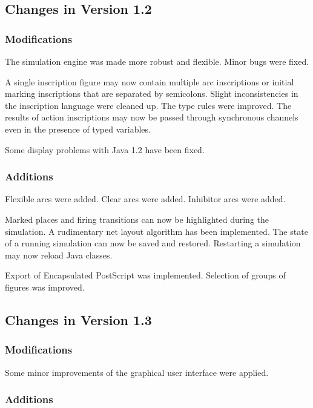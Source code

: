 \subsection{Changes in Version 1.2}

\subsubsection*{Modifications}

The simulation engine was made more robust and flexible.
Minor bugs were fixed.

A single inscription figure may now contain multiple
arc inscriptions or initial marking inscriptions that are separated
by semicolons.
Slight inconsistencies in the inscription language were
cleaned up. The type rules were improved.
The results of action inscriptions may now be passed through
synchronous channels even in the presence of typed variables.

Some display problems with Java 1.2 have been fixed.

\subsubsection*{Additions}

Flexible arcs were added.
Clear arcs were added.
Inhibitor arcs were added.

Marked places and firing transitions can now be highlighted during
the simulation.
A rudimentary net layout algorithm has been implemented.
The state of a running simulation can now be saved and restored.
Restarting a simulation may now reload Java classes.

Export of Encapsulated PostScript was implemented.
Selection of groups of figures was improved.

\subsection{Changes in Version 1.3}

\subsubsection*{Modifications}

Some minor improvements of the graphical user interface were
applied.

\subsubsection*{Additions}

